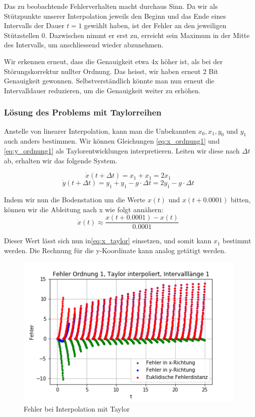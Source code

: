 Das zu beobachtende Fehlerverhalten macht durchaus Sinn. 
Da wir als Stützpunkte unserer Interpolation jeweils den Beginn und das Ende eines Intervalls der Dauer $t=1$ gewählt haben, ist der Fehler an den jeweiligen Stützstellen 0. 
Dazwischen nimmt er erst zu, erreicht sein Maximum in der Mitte des Intervalls, um anschliessend wieder abzunehmen.

Wir erkennen erneut, dass die Genauigkeit etwa 4x höher ist, als bei der Störungskorrektur nullter Ordnung. 
Das heisst, wir haben erneut 2 Bit Genauigkeit gewonnen. 
Selbstverständlich könnte man nun erneut die Intervalldauer reduzieren, um die Genauigkeit weiter zu erhöhen.

\subsubsection{Lösung des Problems mit Taylorreihen}
Anstelle von linearer Interpolation, kann man die Unbekannten $x_0, x_1, y_0$ und $y_1$ auch anders bestimmen. 
Wir können Gleichungen \ref{eq:x_ordnung1} und \ref{eq:y_ordnung1} als Taylorentwicklungen interpretieren. 
Leiten wir diese nach $\Delta t$ ab, erhalten wir das folgende System.

\begin{equation}\label{eq:x_taylor}
    \dot{x}(t+ \Delta t) = x_1 + x_1 = 2x_1
\end{equation}
\begin{equation}\label{eq:y_taylor}
    \dot{y}(t+ \Delta t) = y_1 + y_1 - g \cdot \Delta t = 2y_1 - g \cdot \Delta t
\end{equation}

Indem wir nun die Bodenstation um die Werte $x(t)$ und $x(t+0.0001)$ bitten, können wir die Ableitung nach x wie folgt annähern:
\[
    \dot{x}(t) \approx \frac{x(t+0.0001) - x(t)}{0.0001}
\]

Dieser Wert lässt sich nun in\ref{eq:x_taylor} einsetzen, und somit kann $x_1$ bestimmt werden. 
Die Rechnung für die y-Koordinate kann analog getätigt werden.

\begin{figure}
    \centering
    \includegraphics[scale = 0.7]{papers/perturbation/bilder/taylor_error.png}
    \caption{Fehler bei Interpolation mit Taylor}
	\label{errorOrdnung1Taylor}
\end{figure}

